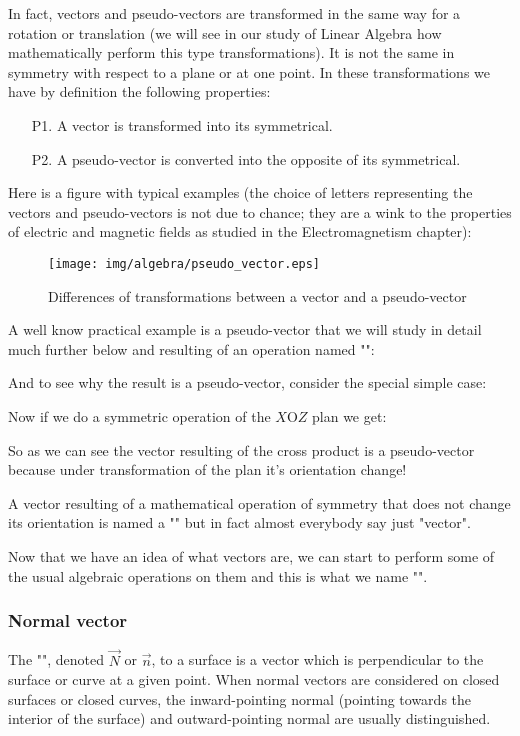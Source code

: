 In fact, vectors and pseudo-vectors are transformed in the same way for a rotation or translation (we will see in our study of Linear Algebra how mathematically perform this type transformations). It is not the same in symmetry with respect to a plane or at one point. In these transformations we have by definition the following properties:
	\begin{enumerate}
		\item[P1.] A vector is transformed into its symmetrical.
		\item[P2.] A pseudo-vector is converted into the opposite of its symmetrical.
	\end{enumerate}
Here is a figure with typical examples (the choice of letters representing the vectors and pseudo-vectors is not due to chance; they are a wink to the properties of electric and magnetic fields as studied in the Electromagnetism chapter):
\begin{figure}[H]
\centering
\texttt{[image: img/algebra/pseudo\_vector.eps]}
\caption{Differences of transformations between a vector and a pseudo-vector}
\end{figure}

A well know practical example is a pseudo-vector that we will study in detail much further below and resulting of an operation named ""\label{cross product}:
	
And to see why the result is a pseudo-vector, consider the special simple case:
	
Now if we do a symmetric operation of the $X\text{O}Z$ plan we get:
	
So as we can see the vector resulting of the cross product is a pseudo-vector because under transformation of the plan it's orientation change!

A vector resulting of a mathematical operation of symmetry that does not change its orientation is named a "" but in fact almost everybody say just "vector".

Now that we have an idea of what vectors are, we can start to perform some of the usual algebraic operations on them and this is what we name "".

	\subsubsection{Normal vector}
	The "\label{normal vector}", denoted $\vec{N}$ or $\vec{n}$, to a surface is a vector which is perpendicular to the surface or curve at a given point. When normal vectors are considered on closed surfaces or closed curves, the inward-pointing normal (pointing towards the interior of the surface) and outward-pointing normal are usually distinguished.

